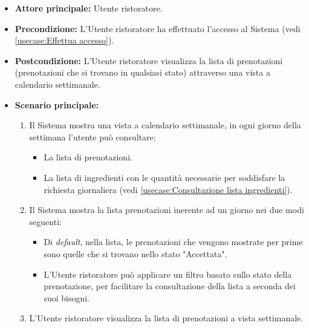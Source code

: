 \label{usecase:Visualizzazione lista prenotazioni}
\begin{itemize}
	\item \textbf{Attore principale:} Utente ristoratore.

	\item \textbf{Precondizione:} L'Utente ristoratore ha effettuato l'accesso al Sistema (vedi \autoref{usecase:Effettua accesso}).

	\item \textbf{Postcondizione:} L'Utente ristoratore visualizza la lista di prenotazioni (prenotazioni che si trovano in qualsiasi stato) attraverso una vista a calendario settimanale.

	\item \textbf{Scenario principale:}
	      \begin{enumerate}
		      \item Il Sistema mostra una vista a calendario settimanale, in ogni giorno della settimana l'utente può consultare:
		            \begin{itemize}
			            \item La lista di prenotazioni.
			            \item La lista di ingredienti con le quantità necessarie per soddisfare la richiesta giornaliera (vedi \autoref{usecase:Consultazione lista ingredienti}).
		            \end{itemize}

		      \item Il Sistema mostra la lista prenotazioni inerente ad un giorno nei due modi seguenti:
		            \begin{itemize}
			            \item Di \textit{default}, nella lista, le prenotazioni che vengono mostrate per prime sono quelle che si trovano nello stato "Accettata".

			            \item L'Utente ristoratore può applicare un filtro basato sullo stato della prenotazione, per facilitare la consultazione della lista a seconda dei suoi bisogni.
		            \end{itemize}

		      \item L'Utente ristoratore visualizza la lista di prenotazioni a vista settimanale.
	      \end{enumerate}
\end{itemize}


